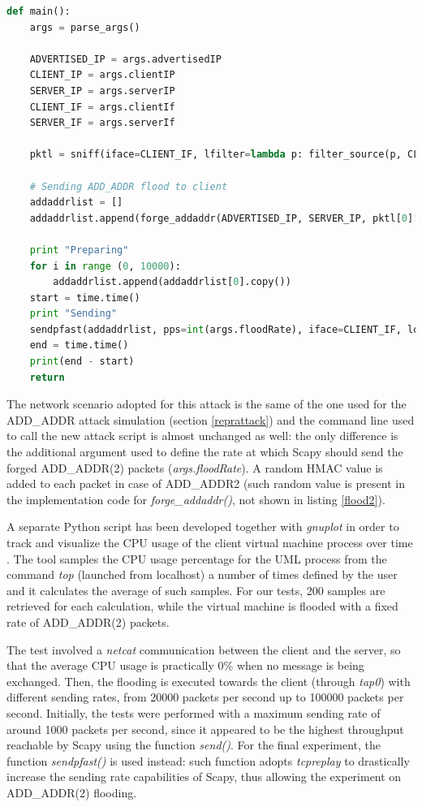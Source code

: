 \begin{lstlisting}[language=Python, caption=Scapy flooding tool (\textit{main()} function), label=flood2]
def main():
    args = parse_args()

    ADVERTISED_IP = args.advertisedIP
    CLIENT_IP = args.clientIP
    SERVER_IP = args.serverIP
    CLIENT_IF = args.clientIf
    SERVER_IF = args.serverIf

    pktl = sniff(iface=CLIENT_IF, lfilter=lambda p: filter_source(p, CLIENT_IP), count=1)

    # Sending ADD_ADDR flood to client
    addaddrlist = []
    addaddrlist.append(forge_addaddr(ADVERTISED_IP, SERVER_IP, pktl[0][TCP].dport, CLIENT_IP, pktl[0][TCP].sport, (pktl[0][TCP].ack)+SEQUENCE_OFFSET, (pktl[0][TCP].seq)-SEQUENCE_OFFSET))

    print "Preparing"
    for i in range (0, 10000):
        addaddrlist.append(addaddrlist[0].copy())
    start = time.time()
    print "Sending"
    sendpfast(addaddrlist, pps=int(args.floodRate), iface=CLIENT_IF, loop=10000, file_cache=True)
    end = time.time()
    print(end - start)
    return
\end{lstlisting}

The network scenario adopted for this attack is the same of the one used for the ADD\_ADDR attack simulation (section \ref{reprattack}) and the command line used to call the new attack script is almost unchanged as well: the only difference is the additional argument used to define the rate at which Scapy should send the forged ADD\_ADDR(2) packets (\textit{args.floodRate}). A random HMAC value is added to each packet in case of ADD\_ADDR2 (such random value is present in the implementation code for \textit{forge\_addaddr()}, not shown in listing \ref{flood2}).

A separate Python script has been developed together with \textit{gnuplot} in order to track and visualize the CPU usage of the client virtual machine process over time \cite{monitor}. The tool samples the CPU usage percentage for the UML process from the command \textit{top} (launched from localhost) a number of times defined by the user and it calculates the average of such samples. For our tests, 200 samples are retrieved for each calculation, while the virtual machine is flooded with a fixed rate of ADD\_ADDR(2) packets.

The test involved a \textit{netcat} communication between the client and the server, so that the average CPU usage is practically 0\% when no message is being exchanged. Then, the flooding is executed towards the client (through \textit{tap0}) with different sending rates, from 20000 packets per second up to 100000 packets per second. Initially, the tests were performed with a maximum sending rate of around 1000 packets per second, since it appeared to be the highest throughput reachable by Scapy using the function \textit{send()}. For the final experiment, the function \textit{sendpfast()} is used instead: such function adopts \textit{tcpreplay} to drastically increase the sending rate capabilities of Scapy, thus allowing the experiment on ADD\_ADDR(2) flooding.

